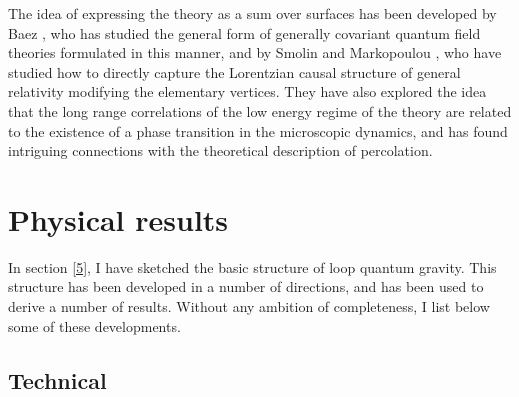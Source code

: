 The idea of expressing the theory as a sum over surfaces has been 
developed by Baez \cite{Baez97}, who has studied the general form 
of generally covariant quantum field theories formulated in this 
manner, and by Smolin and Markopoulou \cite{SmolinMarkopoulo}, 
who have studied how to directly capture the Lorentzian causal 
structure of general relativity modifying the elementary 
vertices.  They have also explored the idea that the long range 
correlations of the low energy regime of the theory are related 
to the existence of a phase transition in the microscopic 
dynamics, and has found intriguing connections with the 
theoretical description of percolation.

\section{Physical results}\label{6}

In section \ref{5}, I have sketched the basic structure of loop 
quantum gravity.  This structure has been developed in a number 
of directions, and has been used to derive a number of results.  
Without any ambition of completeness, I list below some of these 
developments.

\subsection{Technical} \label{technical}

